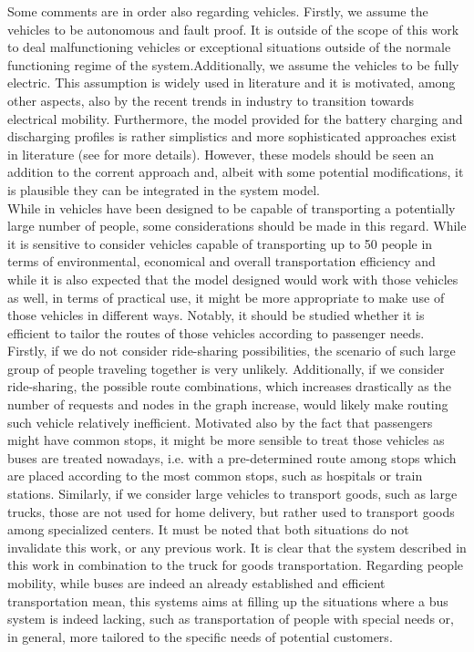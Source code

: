 Some comments are in order also regarding vehicles. Firstly, we assume the vehicles to be autonomous and fault proof. It is outside of the scope of this work to deal malfunctioning vehicles or exceptional situations outside of the normale functioning regime of the system.Additionally, we assume the vehicles to be fully electric. This assumption is widely used in literature and it is motivated, among other aspects, also by the recent trends in industry to transition towards electrical mobility. Furthermore, the model provided for the battery charging and discharging profiles is rather simplistics and more sophisticated approaches exist in literature (see  for more details). However, these models should be seen an addition to the corrent approach and, albeit with some potential modifications, it is plausible they can be integrated in the system model. \\
While in \cite{project_thesis} vehicles have been designed to be capable of transporting a potentially large number of people, some considerations should be made in this regard. While it is sensitive to consider vehicles capable of transporting up to 50 people in terms of environmental, economical and overall transportation efficiency and while it is also expected that the model designed would work with those vehicles as well, in terms of practical use, it might be more appropriate to make use of those vehicles in different ways. Notably, it should be studied whether it is efficient to tailor the routes of those vehicles according to passenger needs. Firstly, if we do not consider ride-sharing possibilities, the scenario of such large group of people traveling together is very unlikely. Additionally, if we consider ride-sharing, the possible route combinations, which increases drastically as the number of requests and nodes in the graph increase, would likely make routing such vehicle relatively inefficient. Motivated also by the fact that passengers might have common stops, it might be more sensible to treat those vehicles as buses are treated nowadays, i.e. with a pre-determined route among stops which are placed according to the most common stops, such as hospitals or train stations. Similarly, if we consider large vehicles to transport goods, such as large trucks, those are not used for home delivery, but rather used to transport goods among specialized centers. It must be noted that both situations do not invalidate this work, or any previous work. It is clear that the system described in this work in combination to the truck for goods transportation. Regarding people mobility, while buses are indeed an already established and efficient transportation mean, this systems aims at filling up the situations where a bus system is indeed lacking, such as transportation of people with special needs or, in general, more tailored to the specific needs of potential customers. \\

